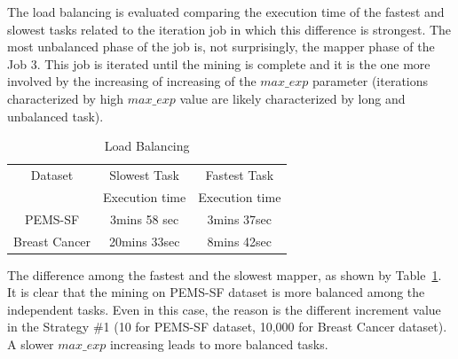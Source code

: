 The load balancing is evaluated comparing the execution time of the fastest and slowest tasks related to the iteration job in which this difference is strongest. The most unbalanced phase of the job is, not surprisingly, the mapper phase of the Job 3. This job is iterated until the mining is complete and it is the one more involved by the increasing of increasing of the $max\_exp$ parameter (iterations characterized by high $max\_exp$ value are likely characterized by long and unbalanced task).
\begin{table}
\begin{center}
\caption{Load Balancing}
\label{load balance final}
\begin{tabular}{ | c | c| c| }
\hline
	Dataset						    & Slowest Task & Fastest Task  \\
							    &  Execution time &  Execution time \\ \hline \hline
	PEMS-SF & 3mins 58 sec & 3mins 37sec \\ \hline
	Breast Cancer & 20mins 33sec & 8mins 42sec\\ \hline
\end{tabular}
\end{center}
\end{table}
The difference among the fastest and the slowest mapper, as shown by Table~\ref{load balance final}. It is clear that the mining on PEMS-SF dataset is more balanced among the independent tasks. Even in this case, the reason is the different increment value in the Strategy \#1 (10 for PEMS-SF dataset, 10,000 for Breast Cancer dataset). A slower $max\_exp$ increasing leads to more balanced tasks.






